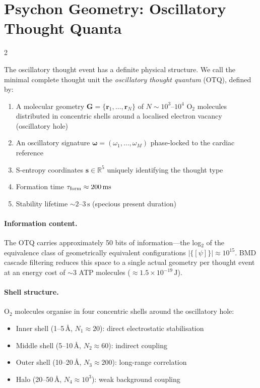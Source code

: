 \section{Psychon Geometry: Oscillatory Thought Quanta}

\begin{multicols}{2}

The oscillatory thought event has a definite physical structure. We call the minimal complete thought unit the \emph{oscillatory thought quantum} (OTQ), defined by:

\begin{enumerate}
\item A molecular geometry $\mathbf{G} = \{\mathbf{r}_1,\ldots,\mathbf{r}_N\}$ of $N \sim 10^3$--$10^4$ O$_2$ molecules distributed in concentric shells around a localised electron vacancy (oscillatory hole)
\item An oscillatory signature $\boldsymbol{\omega} = (\omega_1,\ldots,\omega_M)$ phase-locked to the cardiac reference
\item S-entropy coordinates $\mathbf{s} \in \mathbb{R}^5$ uniquely identifying the thought type
\item Formation time $\tau_{\mathrm{form}} \approx 200\,\mathrm{ms}$
\item Stability lifetime $\sim\!2$--$3\,\mathrm{s}$ (specious present duration)
\end{enumerate}

\paragraph{Information content.}
The OTQ carries approximately 50 bits of information---the log$_2$ of the equivalence class of geometrically equivalent configurations $|\{[\psi]\}| \approx 10^{15}$. BMD cascade filtering reduces this space to a single actual geometry per thought event at an energy cost of $\sim\!3$ ATP molecules ($\approx 1.5\times10^{-19}\,\mathrm{J}$).

\paragraph{Shell structure.}
O$_2$ molecules organise in four concentric shells around the oscillatory hole:
\begin{itemize}
\item Inner shell (1--5\,\AA, $N_1 \approx 20$): direct electrostatic stabilisation
\item Middle shell (5--10\,\AA, $N_2 \approx 60$): indirect coupling
\item Outer shell (10--20\,\AA, $N_3 \approx 200$): long-range correlation
\item Halo (20--50\,\AA, $N_4 \approx 10^3$): weak background coupling
\end{itemize}


\end{multicols}

